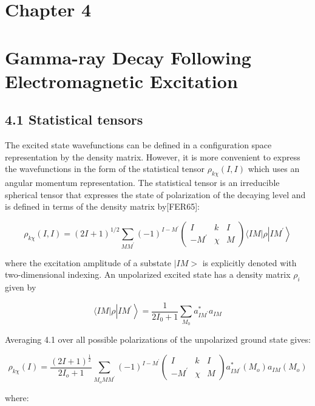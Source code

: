 \documentclass[10pt]{article}
\begin{document}
\section*{Chapter 4}
\section*{Gamma-ray Decay Following Electromagnetic Excitation }


\subsection*{4.1 Statistical tensors}
The excited state wavefunctions can be defined in a configuration space representation by the density matrix. However, it is more convenient to express the wavefunctions in the form of the statistical tensor $\rho_{k \chi}(I, I)$ which uses an angular momentum representation. The statistical tensor is an irreducible spherical tensor that expresses the state of polarization of the decaying level and is defined in terms of the density matrix by[FER65]:

\[
\rho_{k \chi}(I, I)=(2 I+1)^{1 / 2} \sum_{M M^{\prime}}(-1)^{I-M^{\prime}}\left(\begin{array}{ccc}
I & k & I  \tag{4.1}\\
-M^{\prime} & \chi & M
\end{array}\right)\langle I M| \rho\left|I M^{\prime}\right\rangle
\]

where the excitation amplitude of a substate $\mid I M>$ is explicitly denoted with two-dimensional indexing. An unpolarized excited state has a density matrix $\rho_{i}$ given by


\begin{equation*}
\langle I M| \rho\left|I M^{\prime}\right\rangle=\frac{1}{2 I_{0}+1} \sum_{M_{0}} a_{I M^{\prime}}^{*} a_{I M} \tag{4.2}
\end{equation*}


Averaging 4.1 over all possible polarizations of the unpolarized ground state gives:

\[
\rho_{k \chi}(I)=\frac{(2 I+1)^{\frac{1}{2}}}{2 I_{o}+1} \sum_{M_{o} M M^{\prime}}(-1)^{I-M^{\prime}}\left(\begin{array}{ccc}
I & k & I  \tag{4.3}\\
-M^{\prime} & \chi & M
\end{array}\right) a_{I M^{\prime}}^{*}\left(M_{o}\right) a_{I M}\left(M_{o}\right)
\]

where:
\end{document}
